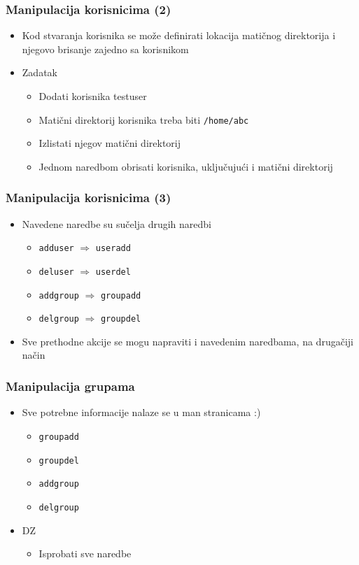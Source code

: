 \documentclass{beamer}
\newcommand{\shell}[1]{\texttt{#1}}
\begin{document}
\begin{frame}[t]
\frametitle{Manipulacija korisnicima (2)}
\begin{itemize}
  \item Kod stvaranja korisnika se može definirati lokacija matičnog 
        direktorija i njegovo brisanje zajedno sa korisnikom
  \item Zadatak
  \begin{itemize}
    \item Dodati korisnika testuser
    \item Matični direktorij korisnika treba biti \shell{/home/abc}
    \item Izlistati njegov matični direktorij
    \item Jednom naredbom obrisati korisnika, uključujući i matični 
          direktorij
  \end{itemize}
\end{itemize}
\end{frame}

\begin{frame}[t]
\frametitle{Manipulacija korisnicima (3)}
\begin{itemize}
  \item Navedene naredbe su sučelja drugih naredbi
  \begin{itemize}
    \item[] \shell{adduser} $\Rightarrow$ \shell{useradd}
    \item[] \shell{deluser} $\Rightarrow$ \shell{userdel}
    \item[] \shell{addgroup} $\Rightarrow$ \shell{groupadd}
    \item[] \shell{delgroup} $\Rightarrow$ \shell{groupdel}
  \end{itemize}
  \item Sve prethodne akcije se mogu napraviti i navedenim naredbama, na 
        drugačiji način
\end{itemize}
\end{frame}

\begin{frame}[t]
\frametitle{Manipulacija grupama}
\begin{itemize}
  \item Sve potrebne informacije nalaze se u man stranicama :)
  \begin{itemize}
    \item[] \shell{groupadd}
    \item[] \shell{groupdel}
    \item[] \shell{addgroup}
    \item[] \shell{delgroup}
  \end{itemize}
  \item DZ
  \begin{itemize}
    \item Isprobati sve naredbe
  \end{itemize}
\end{itemize}
\end{frame}
\end{document}
